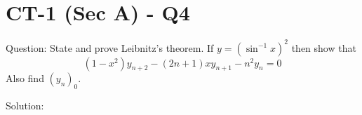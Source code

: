 \documentclass[11pt, a4paper]{article}
\begin{document}


\section*{CT-1 (Sec A) - Q4}

Question:
State and prove Leibnitz's theorem. If $y = (\sin^{-1} x)^2$ then show that 
\[ (1-x^2)y_{n+2} - (2n+1)xy_{n+1} - n^2 y_n = 0 \]
Also find $(y_n)_0$.

Solution:
\end{document}
